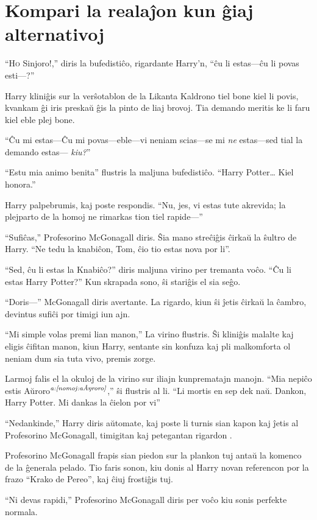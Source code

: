 \chapter{Kompari la realaĵon kun ĝiaj alternativoj}

``\lettrine{H}o Sinjoro!,'' diris la bufedistiĉo, rigardante Harry'n, ``ĉu li
estas—ĉu li povas esti—?''

Harry kliniĝis sur la verŝotablon de la Likanta Kaldrono tiel bone
kiel li povis, kvankam ĝi iris preskaŭ ĝis la pinto de liaj
brovoj. Tia demando meritis ke li faru kiel eble plej bone.

``Ĉu mi estas—Ĉu mi povas—eble—vi neniam scias—se mi \emph{ne} estas—sed
tial la demando estas— \emph{kiu?}''

``Estu mia animo benita'' flustris la maljuna bufedistiĉo. ``Harry
Potter\ldots{} Kiel honora.''

Harry palpebrumis, kaj poste respondis. ``Nu, jes, vi estas tute akrevida; la
plejparto de la homoj ne rimarkas tion tiel rapide—''

``Sufiĉas,'' Profesorino McGonagall diris. Ŝia mano streĉiĝis ĉirkaŭ
la ŝultro de Harry. ``Ne tedu la knabiĉon, Tom, ĉio tio estas nova por
li''.

``Sed, ĉu li estas la Knabiĉo?'' diris maljuna virino per tremanta
voĉo. ``Ĉu li estas Harry Potter?'' Kun skrapada sono, ŝi stariĝis el
sia seĝo.

``Doris—'' McGonagall diris avertante. La rigardo, kiun ŝi ĵetis
ĉirkaŭ la ĉambro, devintus sufiĉi por timigi iun ajn.

``Mi simple volas premi lian manon,'' La virino flustris. Ŝi kliniĝis
malalte kaj eligis ĉifitan manon, kiun Harry, sentante sin konfuza kaj
pli malkomforta ol neniam dum sia tuta vivo, premis zorge.

Larmoj falis el la okuloj de la virino sur iliajn kunprematajn
manojn. ``Mia nepiĉo estis Aŭroro$^{\textit{a:\ref{nomoj:aŭroro}}}$,'' ŝi
flustris al li. ``Li mortis en sep dek naŭ. Dankon, Harry Potter. Mi
dankas la ĉielon por vi''

``Nedankinde,'' Harry diris aŭtomate, kaj poste li turnis sian kapon
kaj ĵetis al Profesorino McGonagall, timigitan kaj petegantan rigardon .

Profesorino McGonagall frapis sian piedon sur la plankon tuj antaŭ la
komenco de la ĝenerala pelado. Tio faris sonon, kiu donis al Harry
novan referencon por la frazo ``Krako de Pereo'', kaj ĉiuj frostiĝis
tuj.

``Ni devas rapidi,'' Profesorino McGonagall diris per voĉo kiu sonis
perfekte normala.

